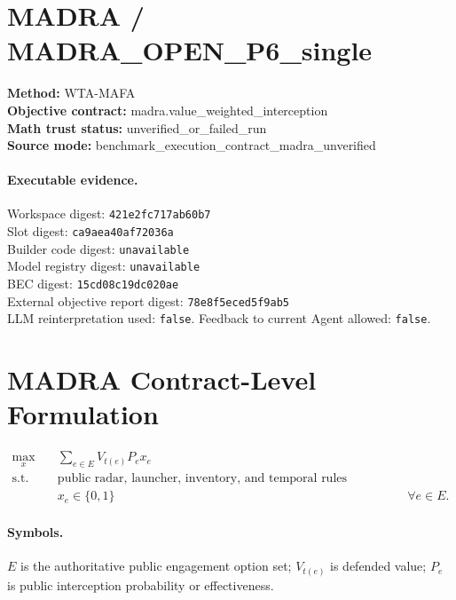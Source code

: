 \documentclass{article}
\begin{document}
\section*{MADRA / MADRA\_OPEN\_P6\_single}
\textbf{Method:} WTA-MAFA\\
\textbf{Objective contract:} madra.value\_weighted\_interception\\
\textbf{Math trust status:} unverified\_or\_failed\_run\\
\textbf{Source mode:} benchmark\_execution\_contract\_madra\_unverified

\paragraph{Executable evidence.}
Workspace digest: \texttt{421e2fc717ab60b7}\\
Slot digest: \texttt{ca9aea40af72036a}\\
Builder code digest: \texttt{unavailable}\\
Model registry digest: \texttt{unavailable}\\
BEC digest: \texttt{15cd08c19dc020ae}\\
External objective report digest: \texttt{78e8f5eced5f9ab5}\\
LLM reinterpretation used: \texttt{false}. Feedback to current Agent allowed: \texttt{false}.

\section*{MADRA Contract-Level Formulation}
\[
\begin{aligned}
\max_{x}\quad
& \sum_{e \in E} V_{t(e)} P_e x_e \\
\text{s.t.}\quad
& \text{public radar, launcher, inventory, and temporal rules declared by the execution contract} \\
& x_e \in \{0,1\} && \forall e \in E.
\end{aligned}
\]
\paragraph{Symbols.} $E$ is the authoritative public engagement option set; $V_{t(e)}$ is defended value; $P_e$ is public interception probability or effectiveness.
\end{document}
